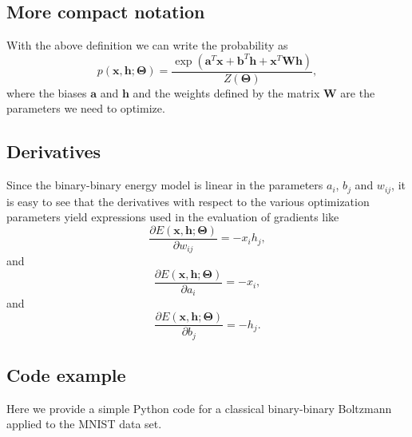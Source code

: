 \documentclass[%
oneside,                 %
final,                   %
10pt]{article}
\begin{document}
\subsection*{More compact notation}

With the above definition we can write the probability as
\[
p(\bm{x},\bm{h};\bm{\Theta}) = \frac{\exp{(\bm{a}^T\bm{x}+\bm{b}^T\bm{h}+\bm{x}^T\bm{W}\bm{h})}}{Z(\bm{\Theta})},
\]
where the biases $\bm{a}$ and $\bm{h}$ and the weights defined by the matrix $\bm{W}$ are the parameters we need to optimize.

\subsection*{Derivatives}

Since the binary-binary energy model is linear in the parameters $a_i$, $b_j$ and
$w_{ij}$, it is easy to see that the derivatives with respect to the
various optimization parameters yield expressions used in the
evaluation of gradients like
\[
\frac{\partial E(\bm{x}, \bm{h};\bm{\Theta})}{\partial w_{ij}}=-x_ih_j,
\]
and
\[
\frac{\partial E(\bm{x}, \bm{h};\bm{\Theta})}{\partial a_i}=-x_i,
\]
and
\[
\frac{\partial E(\bm{x}, \bm{h};\bm{\Theta})}{\partial b_j}=-h_j.
\]

\subsection*{Code example}
Here we provide a simple Python code for a classical binary-binary Boltzmann applied to the MNIST data set.
\end{document}
